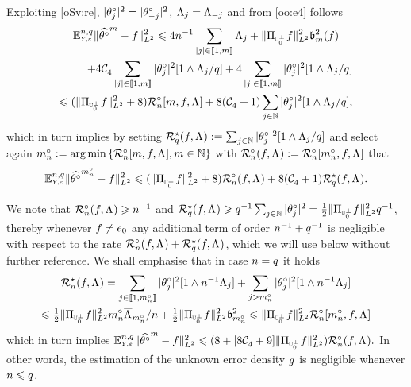 \begin{te}
Exploiting \cref{oSv:re}, $|\fxdf[j]|^2=|\fxdf[-j]|^2$, $\iSv[j]=\iSv[-j]$ and  from \eqref{oo:e4} follows
\begin{multline*}
\FuEx[\ssY,\ssE]{\rY,\rE}\VnormLp{\hxdfPr-\xdf}^2\leq 4\ssY^{-1}\sum_{|j|\in\nset{1,\Di}}\iSv[j]+\VnormLp{\Proj[{\mHiH[0]^\perp}]\xdf}^2\bias^2(\xdf)\\
\hfill+4\cst{4}\sum_{|j|\in\nset{1,\Di}}|\fxdf[j]|^2[1\wedge\iSv[j]/\ssE]
+4\sum_{|j|\in\nset{1,\Di}}|\fxdf[j]|^2[1\wedge\iSv[j]/\ssE]\\
\leq
(\VnormLp{\Proj[{\mHiH[0]^\perp}]\xdf}^2+8) \oRaDi{\Di,\xdf,\iSv}
+8(\cst{4}+1)\sum_{j\in\Nz}|\fxdf[j]|^2[1\wedge \iSv[j]/\ssE],
  \end{multline*}
which in turn implies by setting
$\mRa{\xdf,\iSv}:=\sum_{j\in\Nz}|\fxdf[j]|^2[1\wedge \iSv[j]/\ssE]$
and select again
$\oDi{\ssY}:=\argmin\Nset[{\Di\in\Nz}]{\oRaDi{\Di,\xdf,\iSv}}$
with $\oRa{\xdf,\iSv}:=\oRaDi{\oDi{\ssY},\xdf,\iSv}$ that
\begin{equation}\label{oo:e5}
\FuEx[\ssY,\ssE]{\rY,\rE}\VnormLp{\hxdfPr[\oDi{\ssY}]-\xdf}^2\leq
(\VnormLp{\Proj[{\mHiH[0]^\perp}]\xdf}^2+8) \oRa{\xdf,\iSv}
+8(\cst{4}+1)\mRa{\xdf,\iSv}.
  \end{equation}
\end{te}
\begin{rem}
  We note that $\oRa{\xdf,\iSv}\geq \ssY^{-1}$
  and
  $\mRa{\xdf,\iSv}\geq\ssE^{-1}\sum_{j\in\Nz}|\fxdf[j]|^2=\tfrac{1}{2}\VnormLp{\Proj[{\mHiH[0]^\perp}]\xdf}^2
  \ssE^{-1}$, thereby whenever $\xdf\ne\bas_0$
  any additional term of order $\ssY^{-1}+\ssE^{-1}$
  is negligible with respect to the rate
  $\oRa{\xdf,\iSv}+\mRa{\xdf,\iSv}$,
  which we will use below without further reference. We shall
  emphasise that in case $\ssY=\ssE$ it holds
  \begin{multline}\label{oo:e6}
    \mRa[\ssY]{\xdf,\iSv}=\sum_{j\in\nset{1,\oDi{\ssY}}}|\fxdf[j]|^2[1\wedge
    \ssY^{-1}\iSv[j]]+\sum_{j>\oDi{\ssY}}|\fxdf[j]|^2[1\wedge
    \ssY^{-1}\iSv[j]]\\\leq
    \tfrac{1}{2}\VnormLp{\Proj[{\mHiH[0]^\perp}]\xdf}^2 \oDi{\ssY}
    \oiSv[\oDi{\ssY}]/\ssY +
    \tfrac{1}{2}\VnormLp{\Proj[{\mHiH[0]^\perp}]\xdf}^2\bias[\oDi{\ssY}]^2\leq
    \VnormLp{\Proj[{\mHiH[0]^\perp}]\xdf}^2\oRaDi{\oDi{\ssY},\xdf,\iSv}
  \end{multline}
  which in turn implies
  $\FuEx[\ssY,\ssE]{\rY,\rE}\VnormLp{\hxdfPr-\xdf}^2\leq(8+[8\cst{4}+9]\VnormLp{\Proj[{\mHiH[0]^\perp}]\xdf}^2)\oRa{\xdf,\iSv}.$
  In other words, the estimation of the unknown error density $\edf$
  is negligible whenever $\ssY\leq\ssE$.\remEnd
\end{rem}
